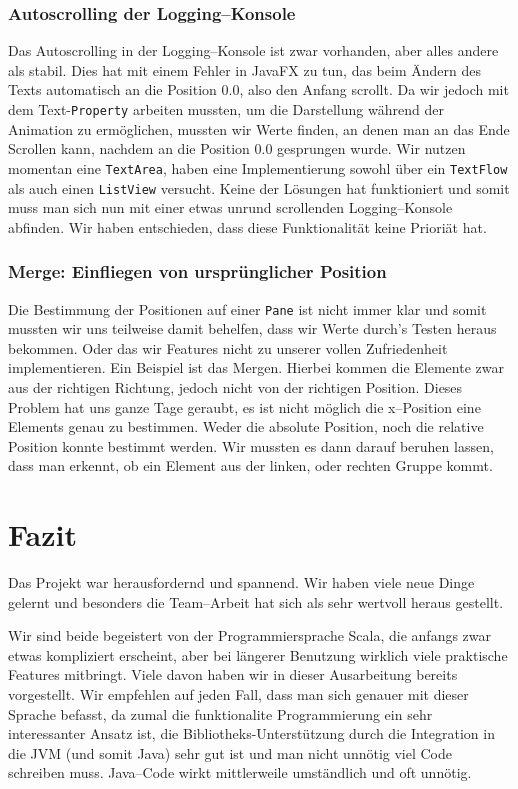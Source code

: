 \subsubsection{Autoscrolling der Logging--Konsole}
Das Autoscrolling in der Logging--Konsole ist zwar vorhanden, aber alles andere als stabil. Dies hat mit einem Fehler in JavaFX zu tun, das beim Ändern des Texts automatisch an die Position 0.0, also den Anfang scrollt. Da wir jedoch mit dem Text-\texttt{Property} arbeiten mussten, um die Darstellung während der Animation zu ermöglichen, mussten wir Werte finden, an denen man an das Ende Scrollen kann, nachdem an die Position 0.0 gesprungen wurde. Wir nutzen momentan eine \texttt{TextArea}, haben eine Implementierung sowohl über ein \texttt{TextFlow} als auch einen \texttt{ListView} versucht. Keine der Lösungen hat funktioniert und somit muss man sich nun mit einer etwas unrund scrollenden Logging--Konsole abfinden. Wir haben entschieden, dass diese Funktionalität keine Prioriät hat.

\subsubsection{Merge: Einfliegen von ursprünglicher Position}
Die Bestimmung der Positionen auf einer \texttt{Pane} ist nicht immer klar und somit mussten wir uns teilweise damit behelfen, dass wir Werte durch's Testen heraus bekommen. Oder das wir Features nicht zu unserer vollen Zufriedenheit implementieren. Ein Beispiel ist das Mergen. Hierbei kommen die Elemente zwar aus der richtigen Richtung, jedoch nicht von der richtigen Position. Dieses Problem hat uns ganze Tage geraubt, es ist nicht möglich die x--Position eine Elements genau zu bestimmen. Weder die absolute Position, noch die relative Position konnte bestimmt werden. Wir mussten es dann darauf beruhen lassen, dass man erkennt, ob ein Element aus der linken, oder rechten Gruppe kommt.

\section{Fazit}\label{sec:fazit}
Das Projekt war herausfordernd und spannend. Wir haben viele neue Dinge gelernt und besonders die Team--Arbeit hat sich als sehr wertvoll heraus gestellt.

Wir sind beide begeistert von der Programmiersprache Scala, die anfangs zwar etwas kompliziert erscheint, aber bei längerer Benutzung wirklich viele praktische Features mitbringt. Viele davon haben wir in dieser Ausarbeitung bereits vorgestellt. Wir empfehlen auf jeden Fall, dass man sich genauer mit dieser Sprache befasst, da zumal die funktionalite Programmierung ein sehr interessanter Ansatz ist, die Bibliotheks-Unterstützung durch die Integration in die JVM (und somit Java) sehr gut ist und man nicht unnötig viel Code schreiben muss. Java--Code wirkt mittlerweile umständlich und oft unnötig.

